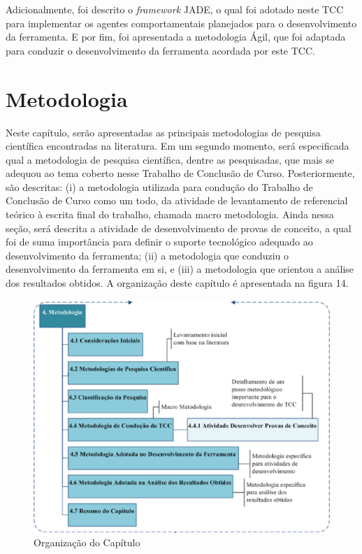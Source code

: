Adicionalmente, foi descrito o \textit{framework} JADE, o qual foi adotado neste TCC para implementar os agentes comportamentais planejados para o desenvolvimento da ferramenta. E por fim, foi apresentada a metodologia Ágil, que foi adaptada para conduzir o desenvolvimento da ferramenta acordada por este TCC.

\newpage
\FloatBarrier
\chapter[METODOLOGIA]{Metodologia}

Neste capítulo, serão apresentadas as principais metodologias de pesquisa científica encontradas na literatura. Em um segundo momento, será especificada qual a metodologia de pesquisa científica, dentre as pesquisadas, que mais se adequou ao tema coberto nesse Trabalho de Conclusão de Curso. Posteriormente, são descritas: (i) a metodologia utilizada para condução do Trabalho de Conclusão de Curso como um todo, da atividade de levantamento de referencial teórico à escrita final do trabalho, chamada macro metodologia. Ainda nessa seção, será descrita a atividade de desenvolvimento de provas de conceito, a qual foi de suma importância para definir o suporte tecnológico adequado ao desenvolvimento da ferramenta; (ii) a metodologia que conduziu o desenvolvimento da ferramenta em si, e (iii) a metodologia que orientou a análise dos resultados obtidos. A organização deste capítulo é apresentada na figura 14.

\begin{figure}[h]
\centering
\label{f10}
\includegraphics[width=1\textwidth]{figuras/cap4}
\caption{Organização do Capítulo}
\end{figure}
\FloatBarrier


